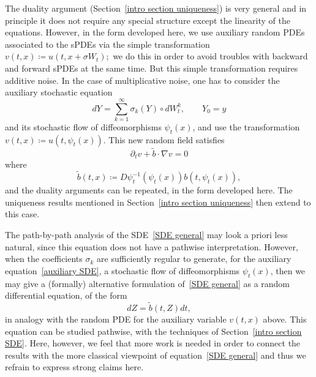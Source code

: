 \documentclass[a4paper,10pt]{article}
\newcommand\1{\mathbbm{1}}
\newcommand{\td}{\tilde}
\numberwithin{equation}{section}
\begin{document}
The duality argument (Section~\ref{intro section uniqueness}) is very general and in principle it does not require any special structure except the linearity of the equations. However, in the form developed here, we use auxiliary random PDEs associated to the sPDEs via the simple transformation $v( t,x) \coloneqq u( t,x+\sigma W_{t}) $;\ we do this in order to avoid troubles with backward and forward sPDEs at the same time. But this simple transformation requires additive noise. In the case of multiplicative noise, one has to consider the auxiliary stochastic equation 
\begin{equation}
dY = \sum_{k=1}^{\infty }\sigma _{k}( Y) \circ dW_{t}^{k},\qquad Y_{0}=y  \label{auxiliary SDE}
\end{equation} 
and its stochastic flow of diffeomorphisms $\psi_{t}( x) $, and use the transformation $v(t,x) \coloneqq u(t,\psi_{t}(x))$. This new random field satisfies 
\begin{equation*}
\partial_t v +\widetilde{b}\cdot \nabla v=0
\end{equation*} 
where
\begin{equation*}
\td{b}(t,x)\coloneqq D\psi^{-1}_t(\psi_t(x))b(t,\psi_t(x)),
\end{equation*}
and the duality arguments can be repeated, in the form developed here. The uniqueness results mentioned in Section~\ref{intro section uniqueness} then extend to this case.

The path-by-path analysis of the SDE~\eqref{SDE general} may look a priori less natural, since this equation does not have a pathwise interpretation. However, when the coefficients $\sigma _{k}$ are sufficiently regular to generate, for the auxiliary equation~\eqref{auxiliary SDE}, a stochastic flow of diffeomorphisms $\psi _{t}( x) $, then we may give a (formally) alternative formulation of~\eqref{SDE general} as a random differential equation, of the form 
\begin{equation*}
dZ = \td{b}(t,Z) dt,
\end{equation*}
in analogy with the random PDE for the auxiliary variable $v(t,x) $ above. This equation can be studied pathwise, with the techniques of Section~\ref{intro section SDE}. Here, however, we feel that more work is needed in order to connect the results with the more classical viewpoint of equation~\eqref{SDE general} and thus we refrain to express strong claims here.
\end{document}
